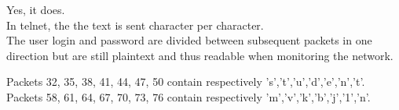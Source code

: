 Yes, it does. \\
In telnet, the the text is sent character per character.\\
The user login and password are divided between subsequent packets in one direction but are still plaintext and thus readable when monitoring the network.

Packets 32, 35, 38, 41, 44, 47, 50 contain respectively 's','t','u','d','e','n','t'.\\

Packets 58, 61, 64, 67, 70, 73, 76 contain respectively 'm','v','k','b','j','1','n'.\\
